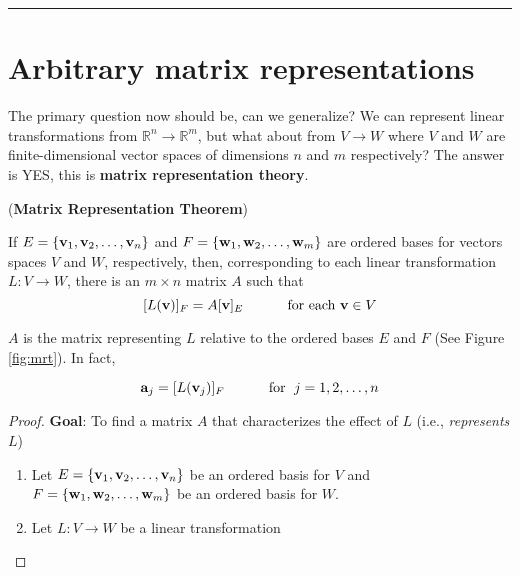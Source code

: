 \rule[0.01in]{\textwidth}{0.0025in}




\section{Arbitrary matrix representations}

The primary question now should be, can we generalize?  We can represent linear transformations from $\mathbb{R}^n \to \mathbb{R}^m$, but what about from $V \to W$ where $V$ and $W$ are finite-dimensional vector spaces of dimensions $n$ and $m$ respectively?  The answer is YES, this is  \textbf{matrix representation theory}.  


\begin{theorem} (\textbf{Matrix Representation Theorem})

If $E = \{ {\bf v}_1, {\bf v}_2, \dots, {\bf v}_n \}$ and $F = \{ {\bf w}_1, {\bf w}_2, \dots, {\bf w}_m \}$ are ordered bases for vectors spaces $V$ and $W$, respectively, then, corresponding to each linear transformation $L: V \to W$, there is an $m \times n$ matrix $A$ such that 
\[  [ L({\bf v})]_F = A[{\bf v}]_E      \hspace{1.0cm}    \text{ for each } {\bf v} \in V \]

$A$ is the matrix representing $L$ relative to the ordered bases $E$ and $F$ (See Figure \ref{fig:mrt}).  In fact, 

\[  {\bf a}_j = [  L({ \bf v}_j)]_F   \hspace{1.0cm}  \text{ for } \;  j = 1, 2, \dots, n  \]

\begin{proof}
	
	
	
	\textbf{Goal}: To find a matrix $A$ that characterizes the effect of $L$ (i.e., \textit{represents $L$}) 
	
 \begin{enumerate}
	\item Let $E = \{ {\bf v}_1, {\bf v}_2, \dots, {\bf v}_n \}$ be an ordered basis for $V$ and $F =  \{ {\bf w}_1, {\bf w}_2, \dots, {\bf w}_m \}$ be an ordered basis for $W$. 
	
	\item Let $L:V \to W$ be a linear transformation
	
	

\end{enumerate}
\end{proof}
\end{theorem}
